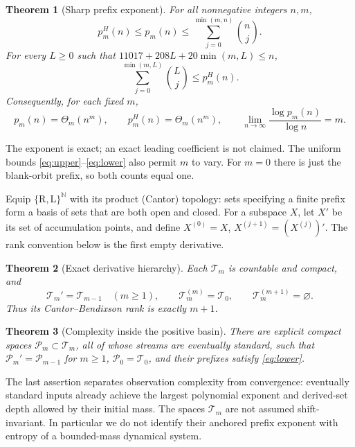 \documentclass[11pt]{article}
\newtheorem{theorem}{Theorem}[section]
\theoremstyle{definition}\newtheorem{definition}[theorem]{Definition}
\theoremstyle{remark}\newtheorem{remark}[theorem]{Remark}
\newcommand{\Tr}{\mathcal T}
\newcommand{\Pos}{\mathcal P}
\newcommand{\N}{\mathbb N}
\newcommand{\Rr}{\mathrm R}
\newcommand{\Ll}{\mathrm L}
\begin{document}
\begin{theorem}[Sharp prefix exponent]\label{thm:prefix}
For all nonnegative integers $n,m$,
\begin{equation}\label{eq:upper}
 p_m^H(n)\le p_m(n)\le\sum_{j=0}^{\min(m,n)}\binom nj.
\end{equation}
For every $L\ge 0$ such that $11017+208L+20\min(m,L)\le n$,
\begin{equation}\label{eq:lower}
 \sum_{j=0}^{\min(m,L)}\binom Lj\le p_m^H(n).
\end{equation}
Consequently, for each fixed $m$,
\[
 p_m(n)=\Theta_m(n^m),\qquad p_m^H(n)=\Theta_m(n^m),\qquad
 \lim_{n\to\infty}\frac{\log p_m(n)}{\log n}=m.
\]
\end{theorem}

The exponent is exact; an exact leading coefficient is not claimed.
The uniform bounds \eqref{eq:upper}--\eqref{eq:lower} also permit $m$ to vary.
For $m=0$ there is just the blank-orbit prefix, so both counts equal one.

Equip $\{\Rr,\Ll\}^{\N}$ with its product (Cantor) topology: sets
specifying a finite prefix form a basis of sets that are both open and closed.
For a subspace $X$, let $X'$
be its set of accumulation points, and define $X^{(0)}=X$,
$X^{(j+1)}=(X^{(j)})'$. The rank convention below is the first empty derivative.

\begin{theorem}[Exact derivative hierarchy]\label{thm:topology}
Each $\Tr_m$ is countable and compact, and
\[
 \Tr_m'=\Tr_{m-1}\quad(m\ge 1),\qquad
 \Tr_m^{(m)}=\Tr_0,\qquad \Tr_m^{(m+1)}=\varnothing.
\]
Thus its Cantor--Bendixson rank is exactly $m+1$.
\end{theorem}

\begin{theorem}[Complexity inside the positive basin]\label{thm:positive}
There are explicit compact spaces $\Pos_m\subset\Tr_m$, all of whose streams
are eventually standard, such that $\Pos_m'=\Pos_{m-1}$ for $m\ge 1$,
$\Pos_0=\Tr_0$, and their prefixes satisfy \eqref{eq:lower}.
\end{theorem}

The last assertion separates observation complexity from convergence:
eventually standard inputs already achieve the largest polynomial exponent
and derived-set depth allowed by their initial mass. The spaces $\Tr_m$ are
not assumed shift-invariant. In particular we do not identify their anchored
prefix exponent with entropy of a bounded-mass dynamical system.
\end{document}
